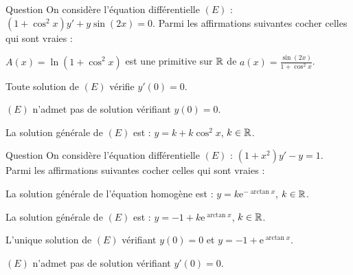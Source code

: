 \begin{multi}[multiple,feedback=
{Toute solution \(y\) de \((E)\) vérifie \(y'(0)=0\) car ,en posant \(x=0\) dans \((E)\), on obtient \(y'(0)=0\). La relation \(\sin(2x)=2\sin x \cos x\) montre que \(a(x)\) est de la forme \(\displaystyle \frac{-u'}{u}\) avec \(u=1+\cos ^2x\). Donc toute primitive de \(a\) est de la forme
\[A(x)=-\ln (1+\cos ^2x)+C,\quad C\in \Rr.\]
La solution générale de \((E)\) est \(y=k(1+\cos ^2x)\), \(k\in \Rr\).
}]{Question}
On considère l'équation différentielle \((E)\) : \(\displaystyle \left(1+\cos ^2x\right)y'+y\sin (2x)=0\). Parmi les affirmations suivantes cocher celles qui sont vraies :

    \item \(\displaystyle A(x)=\ln (1+\cos ^2x)\) est une primitive sur \(\Rr\) de \(\displaystyle a(x)=\frac{\sin (2x)}{1+\cos ^2x}\).
    \item* Toute solution de \((E)\) vérifie \(y'(0)=0\).
    \item \((E)\) n'admet pas de solution vérifiant \(y(0)=0\).
    \item* La solution générale de \((E)\) est : \(\displaystyle y=k+k\cos ^2x\), \(k\in \Rr\).
\end{multi}


\begin{multi}[multiple,feedback=
{Les solutions sur \(\Rr\) de l'équation homogène sont les fonctions \(\displaystyle Y=k\mathrm{e}^{\arctan x}\), \(k\in \Rr\), et \(y_0=-1\) est une solution particulière. Les solutions de \((E)\) sont donc les fonctions
\[y=-1+k\mathrm{e}^{\arctan x},\quad k\in \Rr.\]
La condition \(y(0)=0\) donne \(k=1\). Par ailleurs, \(y=-1\) est une solution de \((E)\) vérifiant \(y'(0)=0\).
}]{Question}
On considère l'équation différentielle \((E)\) : \(\displaystyle (1+x^2)y'-y=1\). Parmi les affirmations suivantes cocher celles qui sont vraies :

    \item La solution générale de l'équation homogène est : \(\displaystyle y=k\mathrm{e}^{-\arctan x}\), \(k\in \Rr\).
    \item* La solution générale de \((E)\) est : \(\displaystyle y=-1+k\mathrm{e}^{\arctan x}\), \(k\in \Rr\).
    \item* L'unique solution de \((E)\) vérifiant \(y(0)=0\) et \(\displaystyle y=-1+\mathrm{e}^{\arctan x}\).
    \item \((E)\) n'admet pas de solution vérifiant \(y'(0)=0\).
\end{multi}


